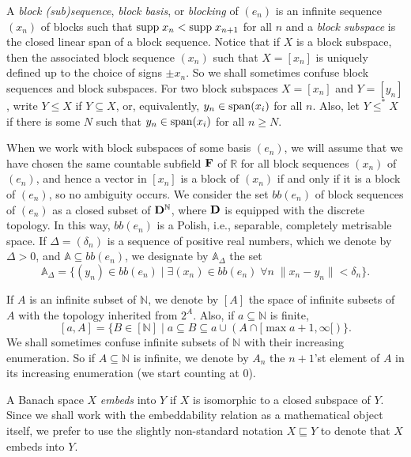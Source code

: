 \documentclass[10pt]{amsart}
\numberwithin{equation}{section}
\begin{document}
A {\em block (sub)sequence}, {\em block basis}, or {\em blocking} of $(e_n)$ is
an infinite sequence $(x_n)$ of blocks such that ${\rm supp}\; x_n<{\rm supp}\;
x_{n+1}$ for all $n$ and a {\em block subspace} is the closed linear span of a
block sequence. Notice that if $X$ is a block subspace, then the associated
block sequence $(x_n)$ such that $X=[x_n]$ is uniquely defined up to the choice
of signs $\pm x_n$. So we shall sometimes confuse block sequences and block
subspaces. For two block subspaces $X=[x_n]$ and $Y=[y_n]$, write $Y{\ensuremath{\leqslant}} X$ if
$Y\subseteq X$, or, equivalently, $y_n\in {\rm span}(x_i)$ for all $n$. Also,
let $Y{\ensuremath{\leqslant}} ^* X$ if there is some $N$ such that $y_n\in {\rm span}(x_i)$ for
all $n{\ensuremath{\geqslant}} N$.

When we work with block subspaces of some basis $(e_n)$, we will assume that we
have chosen the same countable subfield ${\bf F}$ of ${\mathbb R}$ for all block
sequences $(x_n)$ of $(e_n)$, and hence a vector in $[x_n]$ is a block of
$(x_n)$ if and only if it is a block of $(e_n)$, so no ambiguity occurs. We
consider the set $bb(e_n)$ of block sequences of $(e_n)$ as a closed subset of
${\bf D}^{\mathbb N}$, where ${\bf D}$ is equipped with the discrete topology. In this
way, $bb(e_n)$ is a Polish, i.e., separable, completely metrisable space. If
$\Delta=(\delta_n)$ is a sequence of positive real numbers, which we denote by
$\Delta>0$, and ${\mathbb A}\subseteq bb(e_n)$, we designate by ${\mathbb A}_\Delta$ the set
$$
{\mathbb A}_\Delta=\{(y_n)\in bb(e_n){ \; \big| \;} {\exists} (x_n)\in bb(e_n)\; {\forall} n\; {\lVert{x_n-y_n}\rVert}<\delta_n\}.
$$

If $A$ is an infinite subset of ${\mathbb N}$, we denote by $[A]$ the space of infinite
subsets of $A$ with the topology inherited from $2^A$. Also, if $a\subseteq {\mathbb N}$
is finite,
$$
[a,A]=\{B\in [{\mathbb N}]{ \; \big| \;} a\subseteq B \subseteq a\cup ( A\cap  [\max a+1,\infty[) \}.
$$
We shall sometimes confuse infinite subsets of ${\mathbb N}$ with their increasing
enumeration. So if $A\subseteq {\mathbb N}$ is infinite, we denote by $A_n$ the $n+1$'st
element of $A$ in its increasing enumeration (we start counting at $0$).

A Banach space $X$ {\em embeds} into $Y$ if $X$ is isomorphic to a closed subspace of $Y$. Since we shall work with the embeddability relation as a mathematical object itself, we prefer to use the slightly non-standard notation $X\sqsubseteq Y$ to denote that $X$ embeds into $Y$.
\end{document}
